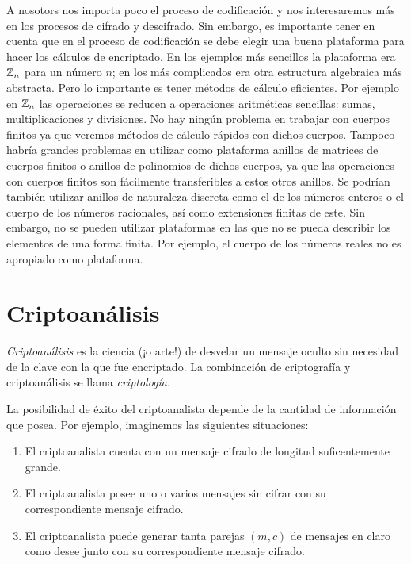 A nosotors nos importa poco el proceso de codificación y nos interesaremos más en los procesos de cifrado y descifrado. Sin embargo, es importante tener en cuenta que en el proceso de codificación se debe elegir una buena plataforma para hacer los cálculos de encriptado. En los ejemplos más sencillos la plataforma era $\mathbb{Z}_n$ para un número $n$; en los más complicados era otra estructura algebraica más abstracta. Pero lo importante es tener métodos de cálculo eficientes. Por ejemplo en $\mathbb{Z}_n$ las operaciones se reducen a operaciones aritméticas sencillas: sumas, multiplicaciones y divisiones. No hay ningún problema en trabajar con cuerpos finitos ya que veremos métodos de cálculo rápidos con dichos cuerpos. Tampoco habría grandes problemas en utilizar como plataforma anillos de matrices de cuerpos finitos o anillos de polinomios de dichos cuerpos, ya que las operaciones con cuerpos finitos son fácilmente transferibles a estos otros anillos. Se podrían también utilizar anillos de naturaleza discreta como el de los números enteros o el cuerpo de los números racionales, así como extensiones finitas de este. Sin embargo, no se pueden utilizar plataformas en las que no se pueda describir los elementos de una forma finita. Por ejemplo, el cuerpo de los números reales no es apropiado como plataforma.

\section{Criptoanálisis}

{\it Criptoanálisis} es la ciencia (¡o arte!) de desvelar un mensaje oculto sin necesidad de la clave con la que fue encriptado. La combinación de criptografía y criptoanálisis se llama {\it criptología}.

La posibilidad de éxito del criptoanalista depende de la cantidad de información que posea. Por ejemplo, imaginemos las siguientes situaciones:

\begin{enumerate}[label=(\arabic*)]
    \item El criptoanalista cuenta con un mensaje cifrado de longitud suficentemente grande.
    \item El criptoanalista posee uno o varios mensajes sin cifrar con su correspondiente mensaje cifrado.
    \item El criptoanalista puede generar tanta parejas $(m,c)$ de mensajes en claro como desee junto con su correspondiente mensaje cifrado.
\end{enumerate}

